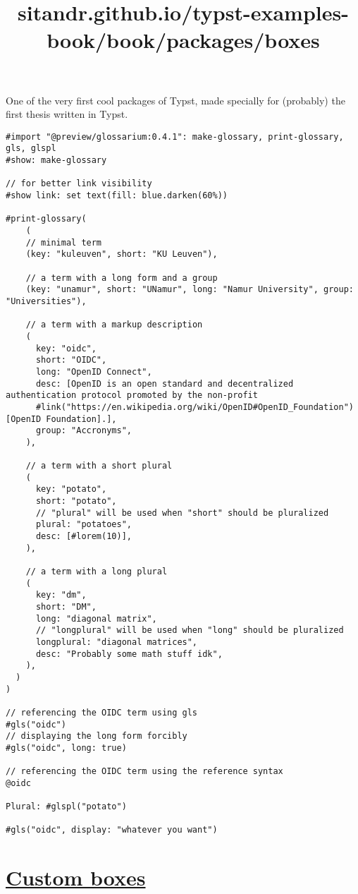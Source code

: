One of the very first cool packages of Typst, made specially for
(probably) the first thesis written in Typst.

\begin{verbatim}
#import "@preview/glossarium:0.4.1": make-glossary, print-glossary, gls, glspl
#show: make-glossary

// for better link visibility
#show link: set text(fill: blue.darken(60%))

#print-glossary(
    (
    // minimal term
    (key: "kuleuven", short: "KU Leuven"),

    // a term with a long form and a group
    (key: "unamur", short: "UNamur", long: "Namur University", group: "Universities"),

    // a term with a markup description
    (
      key: "oidc",
      short: "OIDC",
      long: "OpenID Connect",
      desc: [OpenID is an open standard and decentralized authentication protocol promoted by the non-profit
      #link("https://en.wikipedia.org/wiki/OpenID#OpenID_Foundation")[OpenID Foundation].],
      group: "Accronyms",
    ),

    // a term with a short plural
    (
      key: "potato",
      short: "potato",
      // "plural" will be used when "short" should be pluralized
      plural: "potatoes",
      desc: [#lorem(10)],
    ),

    // a term with a long plural
    (
      key: "dm",
      short: "DM",
      long: "diagonal matrix",
      // "longplural" will be used when "long" should be pluralized
      longplural: "diagonal matrices",
      desc: "Probably some math stuff idk",
    ),
  )
)

// referencing the OIDC term using gls
#gls("oidc")
// displaying the long form forcibly
#gls("oidc", long: true)

// referencing the OIDC term using the reference syntax
@oidc

Plural: #glspl("potato")

#gls("oidc", display: "whatever you want")
\end{verbatim}

\pandocbounded{}


\title{sitandr.github.io/typst-examples-book/book/packages/boxes}

\section{\texorpdfstring{\hyperref[custom-boxes]{Custom
boxes}}{Custom boxes}}\label{custom-boxes}

